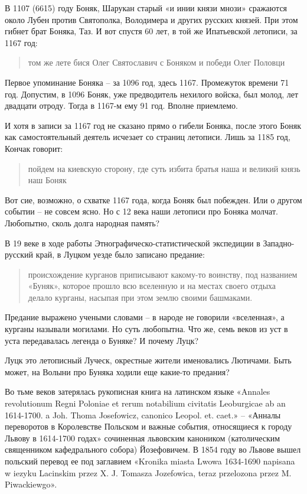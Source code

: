 В 1107 (6615) году Боняк, Шарукан старый «и инии князи мнози» сражаются около Лубен против Святополка, Володимера и других русских князей. При этом гибнет брат Боняка, Таз. И вот спустя 60 лет, в той же Ипатьевской летописи, за 1167 год:

\begin{quotation}
том же лете бися Олег Святославич с Боняком и победи Олег Половци
\end{quotation}

Первое упоминание Боняка – за 1096 год, здесь 1167. Промежуток времени 71 год. Допустим, в 1096 Боняк, уже предводитель нехилого войска, был молод, лет двадцати отроду. Тогда в 1167-м ему 91 год. Вполне приемлемо.

И хотя в записи за 1167 год не сказано прямо о гибели Боняка, после этого Боняк как самостоятельный деятель исчезает со страниц летописи. Лишь за 1185 год, Кончак говорит:

\begin{quotation}
пойдем на киевскую сторону, где суть избита братья наша и великий князь наш Боняк \end{quotation}

Вот сие, возможно, о схватке 1167 года, когда Боняк был побежден. Или о другом событии – не совсем ясно. Но с 12 века наши летописи про Боняка молчат. Любопытно, сколь долга народная память?

В 19 веке в ходе работы Этнографическо-статистичес\-кой экспедиции в Западно-русский край, в Луцком уезде было записано предание\cite{trudy-chub}:

\begin{quotation}
происхождение курганов приписывают какому-то воинству, под названием «Буняк», которое прошло всю вселенную и на местах своего отдыха делало курганы, насыпая при этом землю своими башмаками.
\end{quotation}

Предание выражено учеными словами – в народе не говорили «вселенная», а курганы называли могилами. Но суть любопытна. Что же, семь веков из уст в уста передавалась легенда о Буняке? И почему Луцк?


Луцк это летописный Луческ, окрестные жители именовались Лютичами. Быть может, на Волыни про Буняка ходили еще какие-то предания?

Во тьме веков затерялась рукописная книга на латинском языке «Annales revolutionum Regni Poloniae et rerum notabilium civitatis Leoburgicae ab an 1614-1700. a Joh. Thoma Josefowicz, canonico Leopol. et. caet.» – «Анналы переворотов в Королевстве Польском и важные события, относящиеся к городу Львову в 1614-1700 годах» сочиненная львовским каноником (католическим священником кафедрального собора) Йозефовичем. В 1854 году во Львове вышел польский перевод ее под заглавием «Kronika miasta Lwowa 1634-1690 napisana w iezyku Lacinskim przez X. J. Tomasza Jozefowica, teraz przelozona przez M. Piwackiewgo».

